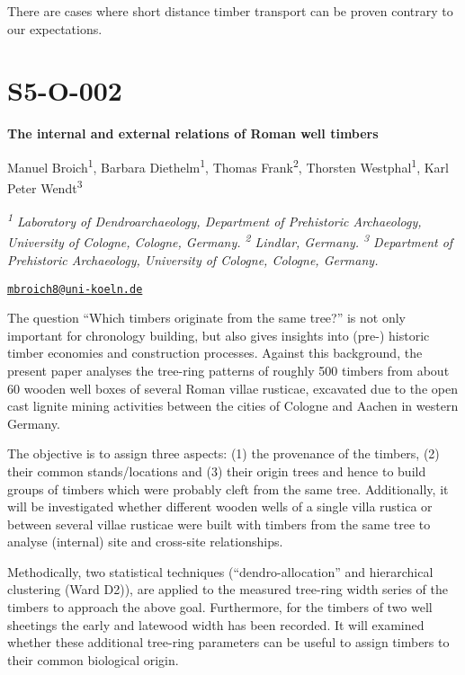 \documentclass[
]{book}
\begin{document}
There are cases where short distance timber transport can be proven contrary to our expectations.

\hypertarget{s5-o-002}{%
\section*{S5-O-002}\label{s5-o-002}}

\textbf{The internal and external relations of Roman well timbers}

Manuel Broich\textsuperscript{1}, Barbara Diethelm\textsuperscript{1}, Thomas Frank\textsuperscript{2}, Thorsten Westphal\textsuperscript{1}, Karl Peter Wendt\textsuperscript{3}

\emph{\textsuperscript{1} Laboratory of Dendroarchaeology, Department of Prehistoric Archaeology, University of Cologne, Cologne, Germany. \textsuperscript{2} Lindlar, Germany. \textsuperscript{3} Department of Prehistoric Archaeology, University of Cologne, Cologne, Germany.}

\href{mailto:mbroich8@uni-koeln.de}{\nolinkurl{mbroich8@uni-koeln.de}}

The question ``Which timbers originate from the same tree?'' is not only important for chronology building, but also gives insights into (pre-) historic timber economies and construction processes. Against this background, the present paper analyses the tree-ring patterns of roughly 500 timbers from about 60 wooden well boxes of several Roman villae rusticae, excavated due to the open cast lignite mining activities between the cities of Cologne and Aachen in western Germany.

The objective is to assign three aspects: (1) the provenance of the timbers, (2) their common stands/locations and (3) their origin trees and hence to build groups of timbers which were probably cleft from the same tree. Additionally, it will be investigated whether different wooden wells of a single villa rustica or between several villae rusticae were built with timbers from the same tree to analyse (internal) site and cross-site relationships.

Methodically, two statistical techniques (``dendro-allocation'' and hierarchical clustering (Ward D2)), are applied to the measured tree-ring width series of the timbers to approach the above goal. Furthermore, for the timbers of two well sheetings the early and latewood width has been recorded. It will examined whether these additional tree-ring parameters can be useful to assign timbers to their common biological origin.
\end{document}
